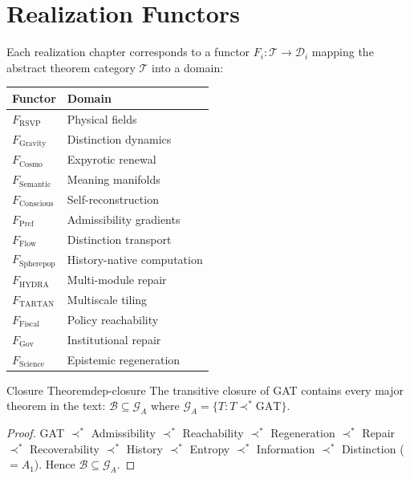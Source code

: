 \documentclass[12pt,twoside,openright]{book}
\begin{document}
\section{Realization Functors}

Each realization chapter corresponds to a functor
$F_i : \mathcal{T} \to \mathcal{D}_i$ mapping the
abstract theorem category $\mathcal{T}$ into a domain:

\begin{center}
\begin{tabular}{ll}
\toprule
Functor & Domain \\
\midrule
$F_\mathrm{RSVP}$ & Physical fields \\
$F_\mathrm{Gravity}$ & Distinction dynamics \\
$F_\mathrm{Cosmo}$ & Expyrotic renewal \\
$F_\mathrm{Semantic}$ & Meaning manifolds \\
$F_\mathrm{Conscious}$ & Self-reconstruction \\
$F_\mathrm{Pref}$ & Admissibility gradients \\
$F_\mathrm{Flow}$ & Distinction transport \\
$F_\mathrm{Spherepop}$ & History-native computation \\
$F_\mathrm{HYDRA}$ & Multi-module repair \\
$F_\mathrm{TARTAN}$ & Multiscale tiling \\
$F_\mathrm{Fiscal}$ & Policy reachability \\
$F_\mathrm{Gov}$ & Institutional repair \\
$F_\mathrm{Science}$ & Epistemic regeneration \\
\bottomrule
\end{tabular}
\end{center}

\begin{theorem}{Closure Theorem}{dep-closure}
  The transitive closure of GAT contains every major
  theorem in the text: $\mathcal{B} \subseteq \mathcal{G}_A$
  where $\mathcal{G}_A = \{T : T \prec^* \text{GAT}\}$.
\end{theorem}

\begin{proof}
  GAT $\prec^*$ Admissibility $\prec^*$ Reachability
  $\prec^*$ Regeneration $\prec^*$ Repair
  $\prec^*$ Recoverability $\prec^*$ History
  $\prec^*$ Entropy $\prec^*$ Information
  $\prec^*$ Distinction ($= A_1$).
  Hence $\mathcal{B} \subseteq \mathcal{G}_A$.
\end{proof}
\end{document}
